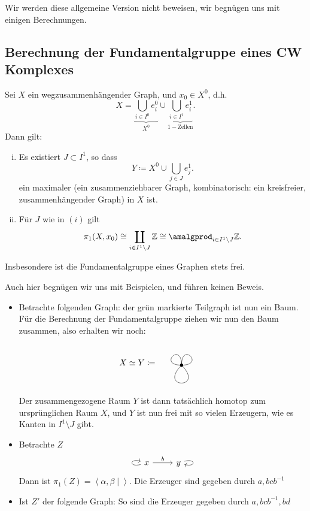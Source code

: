 Wir werden diese allgemeine Version nicht beweisen, wir begnügen uns mit einigen Berechnungen.

\subsection{Berechnung der Fundamentalgruppe eines CW Komplexes}

\begin{theorem}[Graphen]\label{thm:fundamentalgruppe-von-graphen}
    Sei $X$ ein wegzusammenhängender Graph, und  $x_0\in X^0$, d.h.
    \[
    X = \underbrace{\bigcup_{i \in  I^0} e_i^0 }_{X^0} \cup \underbrace{\bigcup_{i \in  I^1} e_i^1
}_{1-\text{Zellen}} 
    .\]
    Dann gilt:
    \begin{enumerate}[(i)]
        \item Es existiert $J\subset I^1$, so dass
            \[
            Y \coloneqq  X^0 \cup \bigcup_{j\in J} e_j^1
            .\] 
            ein maximaler  (ein zusammenziehbarer Graph, kombinatorisch: ein kreisfreier, zusammenhängender Graph) in $X$ ist. 
        \item Für $J$ wie in  $(i)$ gilt
             \[
                 \pi_1(X,x_0) \cong \coprod_{i\in I^1 \setminus J} \Z \cong \amalgprod_{i\in I^1 \setminus J} \Z
            .\] 
    \end{enumerate}
    Insbesondere ist die Fundamentalgruppe eines Graphen stets frei.
\end{theorem}

\begin{oral}
    Auch hier begnügen wir uns mit Beispielen, und führen keinen Beweis.
\end{oral}

\begin{example}
    \begin{itemize}
        \item 
    Betrachte folgenden Graph:
    der grün markierte Teilgraph ist nun ein Baum. Für die Berechnung der Fundamentalgruppe ziehen wir nun den Baum zusammen, also erhalten wir noch:
    \[
       X \simeq Y \coloneqq 
       \begin{tikzpicture}[baseline = -0.2]
        \fill (0,0) circle (2pt);
        \draw (0,0) .. controls (1,0) and (0,1) .. (0,0);
        \draw (0,0) .. controls (0,1) and (-1,0) .. (0,0);
        \draw (0,0) .. controls (-1,-1) and (1,-1) .. (0,0);
    \end{tikzpicture}
\]
Der zusammengezogene Raum $Y$ ist dann tatsächlich homotop zum ursprünglichen Raum $X$, und  $Y$ ist nun frei mit so vielen Erzeugern, wie es Kanten in  $I^1 \setminus J$ gibt.
\item Betrachte  $Z$
    \[
    \begin{tikzcd}
        \arrow[loop left]{a} \ar{r}{b} x & y \ar[loop right]{c}
    \end{tikzcd}
\]
Dann ist $\pi_1(Z) = \left< α,β \mid  \right> $. Die Erzeuger sind gegeben durch $a, bcb^{-1}$
\item Ist $Z'$ der folgende Graph:
    So sind die Erzeuger gegeben durch $a,bc b^{-1}, bd$
    \end{itemize}
\end{example}
